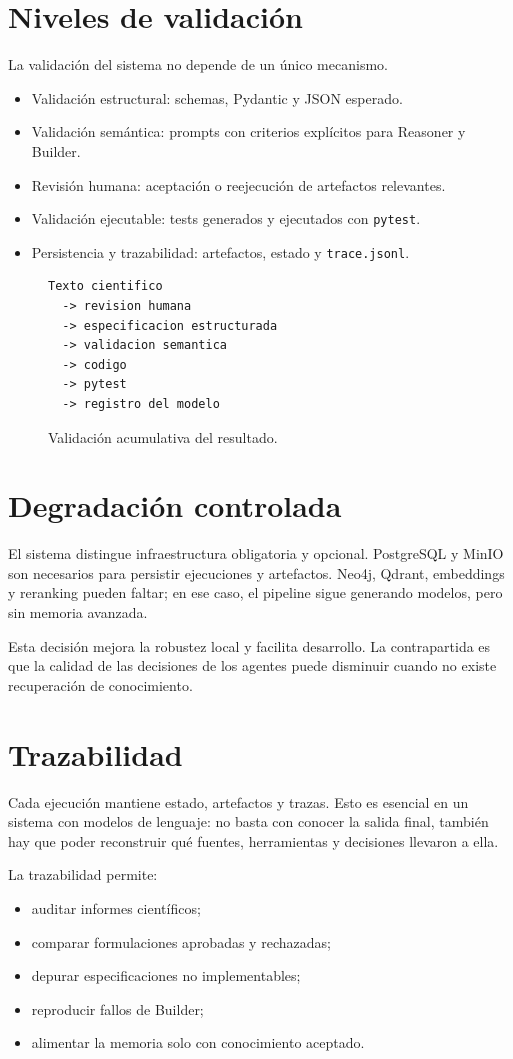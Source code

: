 \section{Niveles de validación}

La validación del sistema no depende de un único mecanismo.

\begin{itemize}
\item Validación estructural: schemas, Pydantic y JSON esperado.
\item Validación semántica: prompts con criterios explícitos para Reasoner y
Builder.
\item Revisión humana: aceptación o reejecución de artefactos relevantes.
\item Validación ejecutable: tests generados y ejecutados con \texttt{pytest}.
\item Persistencia y trazabilidad: artefactos, estado y \texttt{trace.jsonl}.
\end{itemize}

\begin{figure}[H]
\centering
\begin{verbatim}
Texto cientifico
  -> revision humana
  -> especificacion estructurada
  -> validacion semantica
  -> codigo
  -> pytest
  -> registro del modelo
\end{verbatim}
\caption{Validación acumulativa del resultado.}
\end{figure}

\section{Degradación controlada}

El sistema distingue infraestructura obligatoria y opcional. PostgreSQL y MinIO
son necesarios para persistir ejecuciones y artefactos. Neo4j, Qdrant,
embeddings y reranking pueden faltar; en ese caso, el pipeline sigue generando
modelos, pero sin memoria avanzada.

Esta decisión mejora la robustez local y facilita desarrollo. La contrapartida
es que la calidad de las decisiones de los agentes puede disminuir cuando no
existe recuperación de conocimiento.

\section{Trazabilidad}

Cada ejecución mantiene estado, artefactos y trazas. Esto es esencial en un
sistema con modelos de lenguaje: no basta con conocer la salida final, también
hay que poder reconstruir qué fuentes, herramientas y decisiones llevaron a
ella.

La trazabilidad permite:

\begin{itemize}
\item auditar informes científicos;
\item comparar formulaciones aprobadas y rechazadas;
\item depurar especificaciones no implementables;
\item reproducir fallos de Builder;
\item alimentar la memoria solo con conocimiento aceptado.
\end{itemize}
